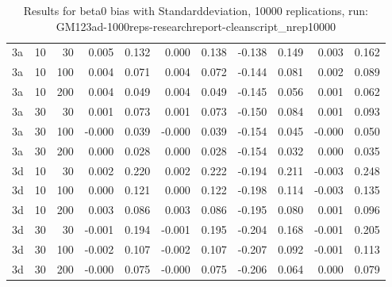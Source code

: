 \begin{table}[ht]
\begin{tabular}{lrrrrrrrrrr}
  3a & 10 & 30 & 0.005 & 0.132 & 0.000 & 0.138 & -0.138 & 0.149 & 0.003 & 0.162 \\ 
  3a & 10 & 100 & 0.004 & 0.071 & 0.004 & 0.072 & -0.144 & 0.081 & 0.002 & 0.089 \\ 
  3a & 10 & 200 & 0.004 & 0.049 & 0.004 & 0.049 & -0.145 & 0.056 & 0.001 & 0.062 \\ 
  3a & 30 & 30 & 0.001 & 0.073 & 0.001 & 0.073 & -0.150 & 0.084 & 0.001 & 0.093 \\ 
  3a & 30 & 100 & -0.000 & 0.039 & -0.000 & 0.039 & -0.154 & 0.045 & -0.000 & 0.050 \\ 
  3a & 30 & 200 & 0.000 & 0.028 & 0.000 & 0.028 & -0.154 & 0.032 & 0.000 & 0.035 \\ 
  3d & 10 & 30 & 0.002 & 0.220 & 0.002 & 0.222 & -0.194 & 0.211 & -0.003 & 0.248 \\ 
  3d & 10 & 100 & 0.000 & 0.121 & 0.000 & 0.122 & -0.198 & 0.114 & -0.003 & 0.135 \\ 
  3d & 10 & 200 & 0.003 & 0.086 & 0.003 & 0.086 & -0.195 & 0.080 & 0.001 & 0.096 \\ 
  3d & 30 & 30 & -0.001 & 0.194 & -0.001 & 0.195 & -0.204 & 0.168 & -0.001 & 0.205 \\ 
  3d & 30 & 100 & -0.002 & 0.107 & -0.002 & 0.107 & -0.207 & 0.092 & -0.001 & 0.113 \\ 
  3d & 30 & 200 & -0.000 & 0.075 & -0.000 & 0.075 & -0.206 & 0.064 & 0.000 & 0.079 \\ 
   \hline
\end{tabular}
\caption{Results for beta0 bias with Standarddeviation, 10000 replications, run: GM123ad-1000reps-researchreport-cleanscript_nrep10000} 
\label{tab:beta0_bias_sd}
\end{table}
